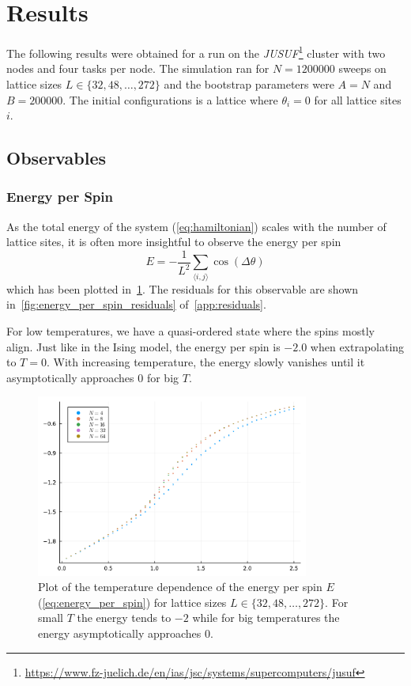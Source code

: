 \section{Results}
The following results were obtained for a run on the \textit{JUSUF}\footnote{\url{https://www.fz-juelich.de/en/ias/jsc/systems/supercomputers/jusuf}} cluster with two nodes and four tasks per node. The simulation ran for $N = \num{1 200 000}$ sweeps on lattice sizes $L\in\{32, 48, \dots, 272\}$ and the bootstrap parameters were $A = N$ and $B = \num{200 000}$. The initial configurations is a lattice where $\theta_i = 0$ for all lattice sites $i$.

\subsection{Observables}\label{sec:observables}
\subsubsection{Energy per Spin}\label{sec:energy_per_spin}
As the total energy of the system (\cref{eq:hamiltonian}) scales with the number of lattice sites, it is often more insightful to observe the energy per spin
\begin{equation}\label{eq:energy_per_spin}
	E = - \frac{1}{L^2} \sum_{\langle i,j \rangle}{\cos{(\Delta \theta)}}
\end{equation}
which has been plotted in~\cref{fig:energy_per_spin}. The residuals for this observable are shown in~\cref{fig:energy_per_spin_residuals} of~\cref{app:residuals}.

For low temperatures, we have a quasi-ordered state where the spins mostly align. Just like in the Ising model, the energy per spin is $-2.0$ when extrapolating to $T=0$. With increasing temperature, the energy slowly vanishes until it asymptotically approaches $0$ for big $T$.
\begin{figure}[ht]
	\centering
	\includegraphics[width=0.8\textwidth]{Energy.pdf}
	\caption[Temperature dependence of the energy per spin $E$]{Plot of the temperature dependence of the energy per spin $E$ (\cref{eq:energy_per_spin}) for lattice sizes $L\in\{32, 48, \dots, 272\}$. For small $T$ the energy tends to $\num{-2}$ while for big temperatures the energy asymptotically approaches $\num{0}$.}
	\label{fig:energy_per_spin}
\end{figure}

